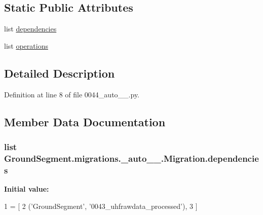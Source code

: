 \subsection*{Static Public Attributes}
\begin{DoxyCompactItemize}
\item 
list \hyperlink{class_ground_segment_1_1migrations_1_10044__auto__20170206__1250_1_1_migration_a7d2e95dac4c803ff3ae0732f7bb55617}{dependencies}
\item 
list \hyperlink{class_ground_segment_1_1migrations_1_10044__auto__20170206__1250_1_1_migration_aafba09623f56b7b093accbe617ca31bb}{operations}
\end{DoxyCompactItemize}


\subsection{Detailed Description}


Definition at line 8 of file 0044\+\_\+auto\+\_\+\_.\+py.



\subsection{Member Data Documentation}
\hypertarget{class_ground_segment_1_1migrations_1_10044__auto__20170206__1250_1_1_migration_a7d2e95dac4c803ff3ae0732f7bb55617}{}
\subsubsection[{dependencies}]{\setlength{\rightskip}{0pt plus 5cm}list Ground\+Segment.\+migrations.\+\_\+auto\+\_\+\_.\+Migration.\+dependencies\hspace{0.3cm}{\ttfamily [static]}}\label{class_ground_segment_1_1migrations_1_10044__auto__20170206__1250_1_1_migration_a7d2e95dac4c803ff3ae0732f7bb55617}
{\bfseries Initial value\+:}
\begin{DoxyCode}
1 = [
2         (\textcolor{stringliteral}{'GroundSegment'}, \textcolor{stringliteral}{'0043\_uhfrawdata\_processed'}),
3     ]
\end{DoxyCode}


